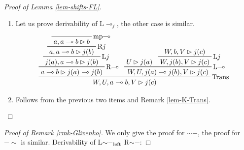 \documentclass[runningheads]{llncs}
\begin{document}
\begin{proof}[Proof of Lemma \ref{lem-shifts-FL}]
\begin{enumerate}
	where steps $(*)$ and $(**)$ correspond to several subsequent applications of R$\cdot$ and L$\cdot$, respectively, and are straightforwardly provable by induction.
	\item Let us prove derivability of L$\multimap_{j}$, the other case is similar.
	\[
	\prftree[r]{Trans}{
		\prftree[r]{\textnormal{R$\multimap$}}{
			\prftree[r]{\textnormal{L$j$}}{
				\prftree[r]{\textnormal{R$j$}}{\prftree[r]{\textnormal{mp$\multimap$}}{a,a\multimap b\rhd b}}{a,a\multimap b\rhd j(b)}
			}{j(a),a\multimap b\rhd j(b)}
		}{a\multimap b\rhd j(a)\multimap j(b)}
	}{
		\prftree[r]{\textnormal{L$\multimap$}}{
			{U\rhd j(a)}
		}{
			\prftree[r]{\textnormal{L$j$}}{
				{W,b,V\rhd j(c)}
			}{W,j(b),V\rhd j(c)}
		}{W,U,j(a)\multimap j(b),V\rhd j(c)}
	}{W,U,a\multimap b,V\rhd j(c)}
	\]
	\item Follows from the previous two items and Remark \ref{lem-K-Trans}.
	\qedhere
\end{enumerate}
\end{proof}

\begin{proof}[Proof of Remark \ref{rmk-Glivenko}]
	We only give the proof for ${\sim}{-}$, the proof for ${-}{\sim}$ is similar.
	Derivability of L${\sim}{-}_\textnormal{left}$ R${\sim}{-}$:

    \begin{adjustbox}{max width=\textwidth}
	\quad\quad
	\qedhere
    \end{adjustbox}
\end{proof}
\end{document}
